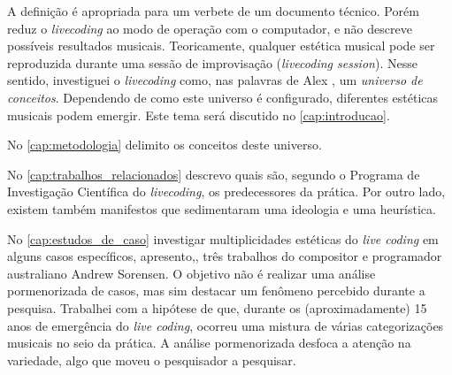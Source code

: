 A definição é apropriada para um verbete de um documento técnico. Porém reduz o \emph{livecoding} ao modo de operação com o computador, e não descreve possíveis resultados musicais. Teoricamente, qualquer estética musical pode ser reproduzida durante uma sessão de improvisação (\emph{livecoding session}). Nesse sentido, investiguei o \emph{livecoding} como, nas palavras de Alex , um \emph{universo de conceitos}. Dependendo de como este universo é configurado, diferentes estéticas musicais podem emergir. Este tema será discutido no \autoref{cap:introducao}. 


No \autoref{cap:metodologia} delimito os conceitos deste universo. 

No \autoref{cap:trabalhos_relacionados} descrevo quais são, segundo o Programa de Investigação Científica do \emph{livecoding}, os predecessores da prática. Por outro lado, existem também manifestos que sedimentaram uma ideologia e uma heurística.

No \autoref{cap:estudos_de_caso} investigar multiplicidades estéticas do \emph{live coding} em alguns casos específicos, apresento,, três trabalhos do compositor e programador australiano Andrew Sorensen. O objetivo não é realizar uma análise pormenorizada de casos, mas sim destacar um fenômeno percebido durante a pesquisa. Trabalhei com a hipótese de que, durante os (aproximadamente) 15 anos de emergência do \emph{live coding}, ocorreu uma mistura de várias categorizações musicais no seio da prática. A análise pormenorizada desfoca a atenção na variedade, algo que moveu o pesquisador a pesquisar.